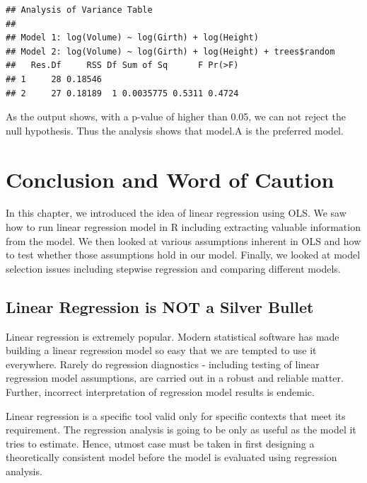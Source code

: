 \documentclass[11pt, letterpaper, twoside]{memoir}\usepackage{knitr}
\begin{document}
\begin{knitrout}
\color{fgcolor}\begin{kframe}
\begin{alltt}
\end{alltt}
\begin{verbatim}
## Analysis of Variance Table
## 
## Model 1: log(Volume) ~ log(Girth) + log(Height)
## Model 2: log(Volume) ~ log(Girth) + log(Height) + trees$random
##   Res.Df     RSS Df Sum of Sq      F Pr(>F)
## 1     28 0.18546                           
## 2     27 0.18189  1 0.0035775 0.5311 0.4724
\end{verbatim}
\end{kframe}
\end{knitrout}

As the output shows, with a p-value of higher than 0.05, we can not reject the null hypothesis. Thus the analysis shows that model.A is the preferred model.


\section{Conclusion and Word of Caution}

In this chapter, we introduced the idea of linear regression using OLS. We saw how to run linear regression model in R including extracting valuable information from the model. We then looked at various assumptions inherent in  OLS and how to test whether those assumptions hold in our model. Finally, we looked at model selection issues including stepwise regression and comparing different models.

\subsection{Linear Regression is NOT a Silver Bullet}

Linear regression is extremely popular. Modern statistical software has made building a linear regression model so easy that we are tempted to use it everywhere. Rarely do regression diagnostics - including testing of linear regression model assumptions, are carried out in a robust and reliable matter. Further, incorrect interpretation of regression model results is endemic. 

Linear regression is a specific tool valid only for specific contexts that meet its requirement. The regression analysis is going to be only as useful as the model it tries to estimate. Hence, utmost case must be taken in first designing a theoretically consistent model before the model is evaluated using regression analysis.
\end{document}
